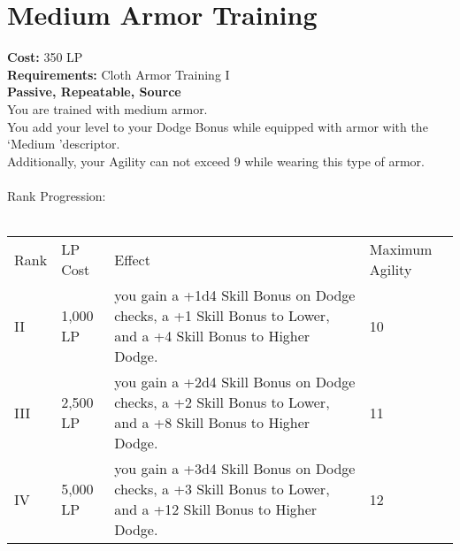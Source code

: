 \section{Medium Armor Training}\label{perk:mediumArmorTraining}
\textbf{Cost:} 350 LP\\
\textbf{Requirements:} Cloth Armor Training I\\
\textbf{Passive, Repeatable, Source}\\
You are trained with medium armor.\\
You add your level to your Dodge Bonus while equipped with armor with the \lq Medium \rq descriptor.\\
Additionally, your Agility can not exceed 9 while wearing this type of armor.\\
\\
Rank Progression:\\
\\
\begin{longtable}{l | l | l | p{9cm}}
	Rank & LP Cost & Effect & Maximum Agility
	\\
	II
	& 1,000 LP
	& you gain a +1d4 Skill Bonus on Dodge checks, a +1 Skill Bonus to Lower, and a +4 Skill Bonus to Higher Dodge.
	& 10
	\\
	III
	& 2,500 LP
	& you gain a +2d4 Skill Bonus on Dodge checks, a +2 Skill Bonus to Lower, and a +8 Skill Bonus to Higher Dodge.
	& 11
	\\
	IV
	& 5,000 LP
	& you gain a +3d4 Skill Bonus on Dodge checks, a +3 Skill Bonus to Lower, and a +12 Skill Bonus to Higher Dodge.
	& 12
	\\
\end{longtable}